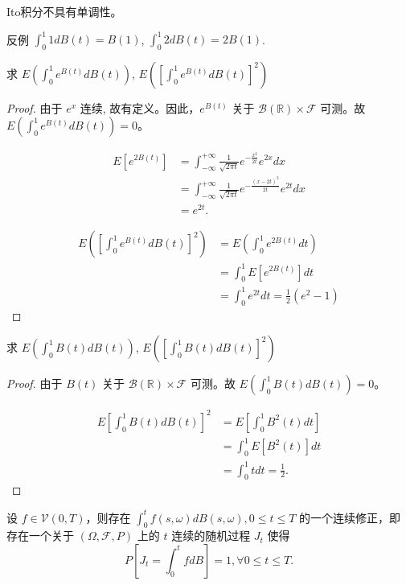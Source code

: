 \documentclass[lang=cn,10pt,thmcnt=section]{elegantbook}
\begin{document}
\begin{remark}
	Ito积分不具有单调性。

反例 \(\int_0^1 1 dB(t) = B(1)\), \(\int_0^1 2 dB(t) = 2B(1)\).
\end{remark}

\begin{example}
	求 \(E\left(\int_0^1 e^{B(t)} dB(t)\right)\), \(E\left(\left[\int_0^1 e^{B(t)} dB(t)\right]^2\right)\) 

\end{example}
\begin{proof}
	由于 \(e^x\) 连续, 故有定义。因此，\(e^{B(t)}\) 关于 \(\mathcal{B}(\mathbb{R}) \times \mathcal{F}\) 可测。故 \(E\left(\int_0^1 e^{B(t)} dB(t)\right) = 0\)。

\begin{align*}
E[e^{2B(t)}] &= \int_{-\infty}^{+\infty} \frac{1}{\sqrt{2\pi t}} e^{-\frac{x^2}{2t}} e^{2x} dx \\
&= \int_{-\infty}^{+\infty} \frac{1}{\sqrt{2\pi t}} e^{-\frac{(x-2t)^2}{2t}} e^{2t} dx \\
&= e^{2t}.
\end{align*}

\begin{align*}
E\left(\left[\int_0^1 e^{B(t)} dB(t)\right]^2\right) &= E\left(\int_0^1 e^{2B(t)} dt\right) \\
&= \int_0^1 E[e^{2B(t)}] dt \\
&= \int_0^1 e^{2t} dt = \frac{1}{2}(e^2 - 1)
\end{align*}
\end{proof}
\begin{example}
	求 \(E\left(\int_0^1 B(t) dB(t)\right)\), \(E\left(\left[\int_0^1 B(t) dB(t)\right]^2\right)\)
\end{example}
\begin{proof}
	由于 \(B(t)\) 关于 \(\mathcal{B}(\mathbb{R}) \times \mathcal{F}\) 可测。故 \(E\left(\int_0^1 B(t) dB(t)\right) = 0\)。

\begin{align*}
E\left[\int_0^1 B(t) dB(t)\right]^2 &= E\left[\int_0^1 B^2(t) dt\right] \\
&= \int_0^1 E[B^2(t)] dt \\
&= \int_0^1 t dt = \frac{1}{2}.
\end{align*}
\end{proof}
\begin{theorem}
	设 \( f \in \mathcal{V}(0, T) \)，则存在 \(\int_0^t f(s, \omega) dB(s, \omega), 0 \leq t \leq T\) 的一个连续修正，即存在一个关于 \((\Omega, \mathcal{F}, P)\) 上的 \( t \) 连续的随机过程 \( J_t \) 使得
\[
P[J_t = \int_0^t f dB] = 1, \forall 0 \leq t \leq T.
\]
\end{theorem}
\end{document}
